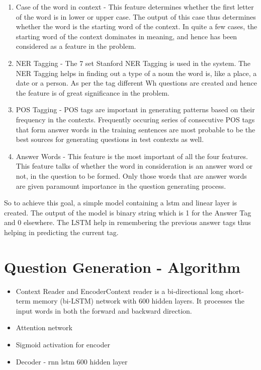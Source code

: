 \begin{enumerate}

\item Case of the word in context - This feature determines whether the first
letter of the word is in lower or upper case. The output of this case thus
determines whether the word is the starting word of the context. In quite a few
cases, the starting word of the context dominates in meaning, and hence has been
considered as a feature in the problem.

\item NER Tagging - The 7 set Stanford NER Tagging is used in the system. The
NER Tagging helps in finding out a type of a noun the word is, like a place, a
date or a person. As per the tag different Wh questions are created and hence
the feature is of great significance in the problem.

\item POS Tagging - POS tags are important in generating patterns based on their
frequency in the contexts. Frequently occuring series of consecutive POS tags
that form answer words in the training sentences are most probable to be the
best sources for generating questions in test contexts as well.

\item Answer Words - This feature is the most important of all the four
features. This feature talks of whether the word in consideration is an answer
word or not, in the question to be formed. Only those words that are answer
words are given paramount importance in the question generating process.

\end{enumerate}

So to achieve this goal, a simple model containing a lstm and linear layer is
created. The output of the model is binary string which is 1 for the Answer Tag
and 0 elsewhere.  The LSTM help in remembering the previous answer tags thus
helping in predicting the current tag.

\section{Question Generation - Algorithm}

\begin{itemize}

\item Context Reader and EncoderContext reader is a bi-directional long
short-term memory (bi-LSTM) network with 600 hidden layers. It processes the
input words in both the forward and backward direction.

\item Attention network

\item Sigmoid activation for encoder

\item Decoder - rnn lstm 600 hidden layer

\end{itemize}

